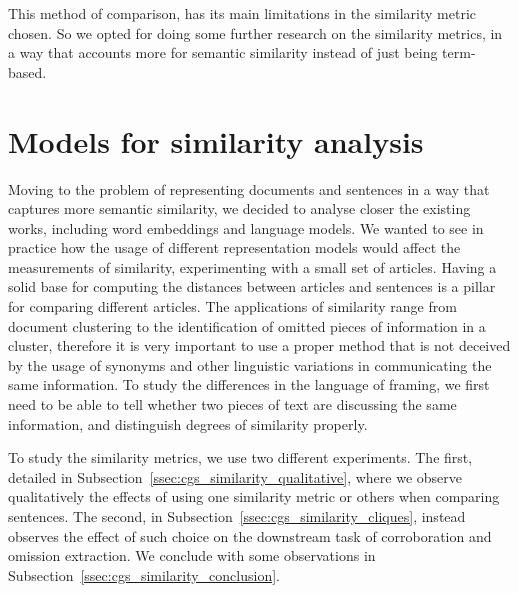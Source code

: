 This method of comparison, has its main limitations in the similarity metric chosen. So we opted for doing some further research on the similarity metrics, in a way that accounts more for semantic similarity instead of just being term-based.


\section{Models for similarity analysis}
\label{sec:cgs_similarity}
Moving to the problem of representing documents and sentences in a way that captures more semantic similarity, we decided to analyse closer the existing works, including word embeddings and language models.
We wanted to see in practice how the usage of different representation models would affect the measurements of similarity, experimenting with a small set of articles. 
Having a solid base for computing the distances between articles and sentences is a pillar for comparing different articles. The applications of similarity range from document clustering to the identification of omitted pieces of information in a cluster, therefore it is very important to use a proper method that is not deceived by the usage of synonyms and other linguistic variations in communicating the same information. To study the differences in the language of framing, we first need to be able to tell whether two pieces of text are discussing the same information, and distinguish degrees of similarity properly.

To study the similarity metrics, we use two different experiments. The first, detailed in Subsection~\ref{ssec:cgs_similarity_qualitative}, where we observe qualitatively the effects of using one similarity metric or others when comparing sentences. The second, in Subsection~\ref{ssec:cgs_similarity_cliques}, instead observes the effect of such choice on the downstream task of corroboration and omission extraction.
We conclude with some observations in Subsection~\ref{ssec:cgs_similarity_conclusion}.


